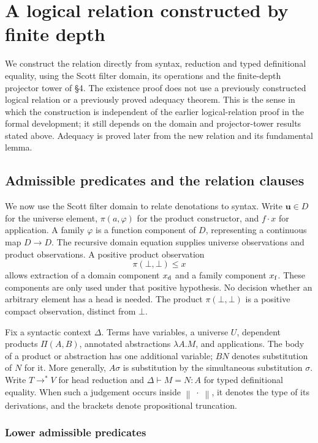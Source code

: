 \documentclass[11pt,a4paper]{article}
\theoremstyle{definition}
\theoremstyle{remark}
\newcommand{\trunc}[1]{\left\lVert #1\right\rVert}
\newcommand{\appl}{\mathbin{\cdot}}
\begin{document}
\section{A logical relation constructed by finite depth}

We construct the relation directly from syntax, reduction and typed
definitional equality, using the Scott filter domain, its operations and
the finite-depth projector tower of \S4. The existence proof does not use
a previously constructed logical relation or a previously proved adequacy
theorem. This is the sense in which the construction is independent of
the earlier logical-relation proof in the formal development; it still
depends on the domain and projector-tower results stated above. Adequacy
is proved later from the new relation and its fundamental lemma.

\subsection{Admissible predicates and the relation clauses}

We now use the Scott filter domain to relate denotations to syntax.
Write $\mathbf u\in D$ for the universe element,
$\pi(a,\varphi)$ for the product constructor, and $f\appl x$ for
application. A family $\varphi$ is a function component of $D$, representing
a continuous map $D\to D$. The recursive domain equation supplies
universe observations and product observations. A positive product
observation
\[
 \pi(\bot,\bot)\leq x
\]
allows extraction of a domain component $x_{\rm d}$ and a family
component $x_{\rm f}$. These components are only used under that positive
hypothesis. No decision whether an arbitrary element has a head is needed.
The product $\pi(\bot,\bot)$ is a positive compact observation, distinct
from $\bot$.

Fix a syntactic context $\Delta$. Terms have variables, a universe $U$,
dependent products $\Pi(A,B)$, annotated abstractions $\lambda A.M$, and
applications. The body of a product or abstraction has one additional
variable; $B N$ denotes substitution of $N$ for it. More generally,
$A\sigma$ is substitution by the simultaneous substitution $\sigma$. Write
$T\longrightarrow^* V$ for head reduction and
$\Delta\vdash M=N:A$ for typed definitional equality. When such a
judgement occurs inside $\trunc{\;\cdot\;}$, it denotes the type of its
derivations, and the brackets denote propositional truncation.

\subsubsection{Lower admissible predicates}
\end{document}
